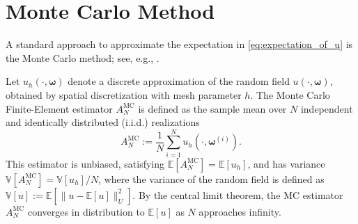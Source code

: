 
\section{Monte Carlo Method}\label{sec:MC}

A standard approach to approximate the expectation in \eqref{eq:expectation_of_u} is the Monte Carlo method; 
see, e.g.,  \cite{MBGiles_2015a,MDGunzburger_CGWebster_GZhang_2014a}.

Let $u_h (\cdot, \boldsymbol{\omega})$ denote a discrete approximation of the random field $u(\cdot, \boldsymbol{\omega})$, obtained by spatial discretization with mesh parameter $h$. The Monte Carlo Finite-Element estimator $A^{\text{MC}}_{N}$ is defined as the sample mean over $N$ independent and identically distributed (i.i.d.) realizations 
%
\begin{equation}\label{eq:MC_estimator}
    A^{\text{MC}}_{N} := \frac{1}{N}\sum_{i=1}^{N} u_{h}\left(\cdot, \boldsymbol{\omega}^{(i)}\right).
\end{equation}
%
This estimator is unbiased, satisfying $\mathbb{E}[A^{\text{MC}}_{N}] = \mathbb{E}[u_{h}]$, and has variance $\mathbb{V}[A^{\text{MC}}_{N}] = \mathbb{V}[u_{h}]/{N}$, where the variance of the random field is defined as $\mathbb{V}[u] := \mathbb{E}[ \big\|  u - \mathbb{E}[u] \big\| _U^2]$. By the central limit theorem, the MC estimator $A^{\text{MC}}_{N}$ converges in distribution to $\mathbb{E}[u]$ as $N$ approaches infinity. 

